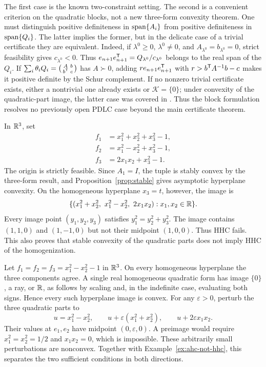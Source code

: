 The first case is the known two-constraint setting. The second is a
convenient criterion on the quadratic blocks, not a new three-form
convexity theorem. One must distinguish positive
definiteness in $\operatorname{span}\{A_i\}$ from positive definiteness in
$\operatorname{span}\{Q_i\}$. The latter implies the former, but in the delicate
case of a trivial certificate they are equivalent. Indeed, if
$\lambda^0\geq0$, $\lambda^0\ne0$, and
$A_{\lambda^0}=b_{\lambda^0}=0$, strict feasibility gives
$c_{\lambda^0}<0$. Thus
$e_{n+1}e_{n+1}^{\mathsf T}=Q_{\lambda^0}/c_{\lambda^0}$ belongs to
the real span of the $Q_i$. If
$\sum_i\theta_iQ_i=\left(\begin{smallmatrix}A&b\\b^{\mathsf T}&c\end{smallmatrix}\right)$
has $A\succ0$, adding $r e_{n+1}e_{n+1}^{\mathsf T}$ with
$r>b^{\mathsf T} A^{-1}b-c$ makes it positive definite by the Schur
complement. If no nonzero trivial certificate exists, either a
nontrivial one already exists or $\mathcal K=\{0\}$; under convexity
of the quadratic-part image, the latter case was covered in
\citet[Proposition~2.14]{BDSpreprint}. Thus the block formulation
resolves no previously open PDLC case beyond the main certificate
theorem.

\begin{example}
\label{ex:ahc-not-hhc}
In $\mathbb R^3$, set
\[
 \begin{split}
 f_1&=x_1^2+x_2^2+x_3^2-1,\\
 f_2&=x_1^2-x_2^2+x_3^2-1,\\
 f_3&=2x_1x_2+x_3^2-1.
 \end{split}
\]
The origin is strictly feasible. Since $A_1=I$, the tuple is stably
convex by the three-form result, and Proposition~\ref{prop:stable}
gives asymptotic hyperplane convexity.
On the homogeneous hyperplane $x_3=t$, however, the image is
\[
 \{(x_1^2+x_2^2,\ x_1^2-x_2^2,\ 2x_1x_2):x_1,x_2\in\R\}.
\]
Every image point $(y_1,y_2,y_3)$ satisfies
$y_1^2=y_2^2+y_3^2$. The image contains $(1,1,0)$ and $(1,-1,0)$
but not their midpoint $(1,0,0)$. Thus HHC fails. This also proves
that stable convexity of the quadratic parts does not imply HHC of
the homogenization.
\end{example}

\begin{example}
\label{ex:hhc-not-stable}
Let $f_1=f_2=f_3=x_1^2-x_2^2-1$ in $\mathbb R^3$. On every homogeneous
hyperplane the three components agree. A single real homogeneous
quadratic form has image $\{0\}$, a ray, or $\mathbb R$, as follows by
scaling and, in the indefinite case, evaluating both signs. Hence
every such hyperplane image is convex.
For any $\varepsilon>0$, perturb the three quadratic parts to
\[
 u=x_1^2-x_2^2,\qquad
 u+\varepsilon(x_1^2+x_2^2),\qquad
 u+2\varepsilon x_1x_2.
\]
Their values at $e_1,e_2$ have midpoint $(0,\varepsilon,0)$.
A preimage would require $x_1^2=x_2^2=1/2$ and $x_1x_2=0$, which
is impossible. These arbitrarily small perturbations are nonconvex.
Together with Example~\ref{ex:ahc-not-hhc}, this separates the two
sufficient conditions in both directions.
\end{example}

